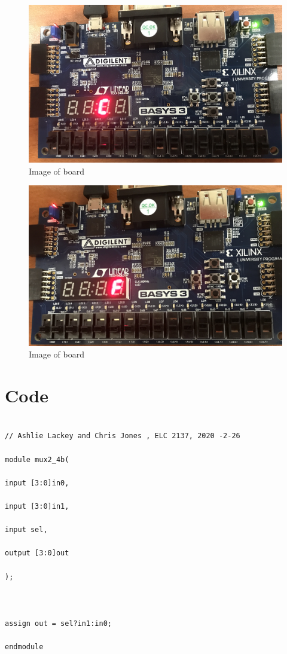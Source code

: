 \documentclass[11pt]{article}
\begin{document}
\begin{figure}[ht]\centering
	
	\includegraphics[width=1.0\textwidth]{c}
	\caption{Image of board}
	\label{fig:sim_with_table}
\end{figure}
\clearpage

\begin{figure}[ht]\centering
	
	\includegraphics[width=1.0\textwidth]{f}
	\caption{Image of board}
	\label{fig:sim_with_table}
\end{figure}
\clearpage


\section*{Code}

\begin{lstlisting}[style=Verilog,caption=mux2-4b Module Code,label=code:ex ]

// Ashlie Lackey and Chris Jones , ELC 2137, 2020 -2-26

module mux2_4b(

input [3:0]in0,

input [3:0]in1,

input sel,

output [3:0]out 

);



assign out = sel?in1:in0;

endmodule

\end{lstlisting}
\end{document}
